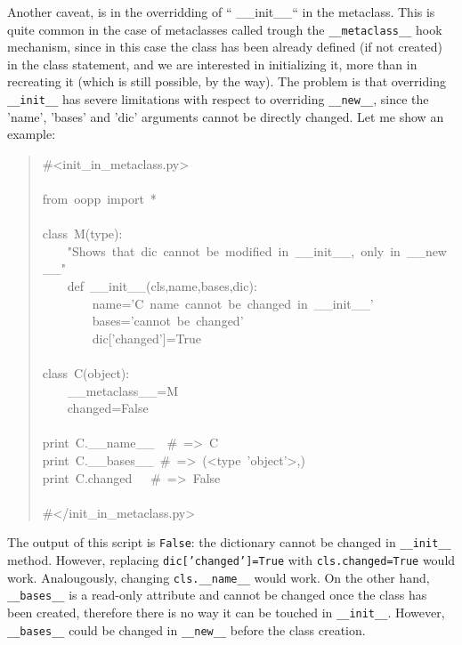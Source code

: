 \documentclass[10pt,english]{article}
\begin{document}
Another caveat, is in the overridding of `` {\_}{\_}init{\_}{\_}`` in the metaclass.
This is quite common in the case of metaclasses called trough the
\texttt{{\_}{\_}metaclass{\_}{\_}} hook mechanism, since in this case the class
has been already defined (if not created) in the class statement,
and we are interested in initializing it, more than in recreating
it (which is still possible, by the way). 
The problem is that overriding \texttt{{\_}{\_}init{\_}{\_}} has severe limitations 
with respect to overriding \texttt{{\_}{\_}new{\_}{\_}},
since the 'name', 'bases' and 'dic' arguments cannot be directly
changed. Let me show an example:
\begin{quote}
\begin{ttfamily}\begin{flushleft}
\mbox{{\#}<init{\_}in{\_}metaclass.py>}\\
\mbox{}\\
\mbox{from~oopp~import~*}\\
\mbox{}\\
\mbox{class~M(type):}\\
\mbox{~~~~"Shows~that~dic~cannot~be~modified~in~{\_}{\_}init{\_}{\_},~only~in~{\_}{\_}new{\_}{\_}"}\\
\mbox{~~~~def~{\_}{\_}init{\_}{\_}(cls,name,bases,dic):}\\
\mbox{~~~~~~~~name='C~name~cannot~be~changed~in~{\_}{\_}init{\_}{\_}'}\\
\mbox{~~~~~~~~bases='cannot~be~changed'}\\
\mbox{~~~~~~~~dic['changed']=True}\\
\mbox{}\\
\mbox{class~C(object):}\\
\mbox{~~~~{\_}{\_}metaclass{\_}{\_}=M}\\
\mbox{~~~~changed=False}\\
\mbox{}\\
\mbox{print~C.{\_}{\_}name{\_}{\_}~~{\#}~=>~C}\\
\mbox{print~C.{\_}{\_}bases{\_}{\_}~{\#}~=>~(<type~'object'>,)}\\
\mbox{print~C.changed~~~{\#}~=>~False}\\
\mbox{}\\
\mbox{{\#}</init{\_}in{\_}metaclass.py>}
\end{flushleft}\end{ttfamily}
\end{quote}

The output of this script is \texttt{False}: the dictionary cannot be changed in 
\texttt{{\_}{\_}init{\_}{\_}} method. However, replacing \texttt{dic['changed']=True} with 
\texttt{cls.changed=True} would work. Analougously, changing  \texttt{cls.{\_}{\_}name{\_}{\_}} 
would work. On the other hand, \texttt{{\_}{\_}bases{\_}{\_}} is a read-only attribute and 
cannot be changed once the class has been created, therefore there is no 
way it can be touched in \texttt{{\_}{\_}init{\_}{\_}}. However, \texttt{{\_}{\_}bases{\_}{\_}} could be
changed in \texttt{{\_}{\_}new{\_}{\_}} before the class creation.
\end{document}
